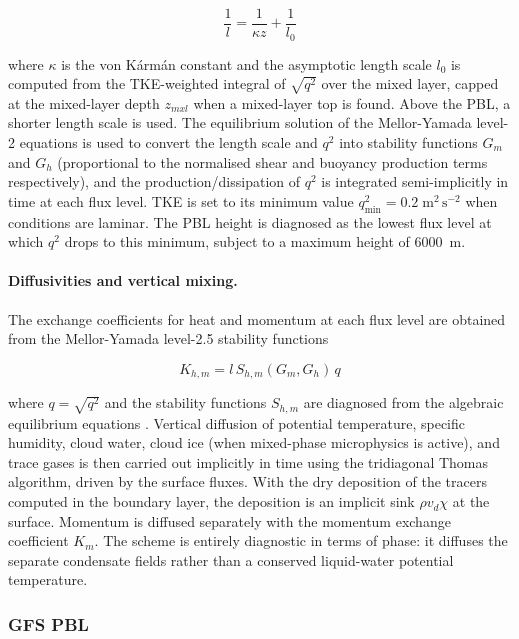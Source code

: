 \begin{equation}
  \frac{1}{l} = \frac{1}{\kappa z} + \frac{1}{l_0}
\end{equation}

where $\kappa$ is the von K\'{a}rm\'{a}n constant and the asymptotic length
scale $l_0$ is computed from the TKE-weighted integral of $\sqrt{q^2}$ over the
mixed layer, capped at the mixed-layer depth $z_{mxl}$ when a mixed-layer top
is found.  Above the PBL, a
shorter length scale is used.  The equilibrium solution of the Mellor-Yamada
level-2 equations is used to convert the length scale and $q^2$ into stability
functions $G_m$ and $G_h$ (proportional to the normalised shear and buoyancy
production terms respectively), and the production/dissipation of $q^2$ is
integrated semi-implicitly in time at each flux level.  TKE is set to its
minimum value $q^2_{\min} = 0.2\;\mathrm{m^2\,s^{-2}}$ when conditions are
laminar.  The PBL height is diagnosed as the lowest flux level at which $q^2$
drops to this minimum, subject to a maximum height of 6000~m.

\paragraph{Diffusivities and vertical mixing.}
The exchange coefficients for heat and momentum at each flux level are obtained
from the Mellor-Yamada level-2.5 stability functions

\begin{equation}
  K_{h,m} = l\, S_{h,m}(G_m, G_h)\,q
\end{equation}

where $q = \sqrt{q^2}$ and the stability functions $S_{h,m}$ are diagnosed from
the algebraic equilibrium equations \citep{Mellor_82}.
Vertical diffusion of potential temperature, specific humidity, cloud water,
cloud ice (when mixed-phase microphysics is active), and trace gases is then
carried out implicitly in time using the tridiagonal Thomas algorithm, driven
by the surface fluxes.  With the dry deposition of the tracers computed in the
boundary layer, the deposition is an implicit sink $\rho v_d \chi$ at the
surface.
Momentum is diffused separately with the momentum exchange coefficient $K_m$.
The scheme is entirely diagnostic in terms of phase: it diffuses the separate
condensate fields rather than a conserved liquid-water potential temperature.

\subsubsection{GFS PBL}


